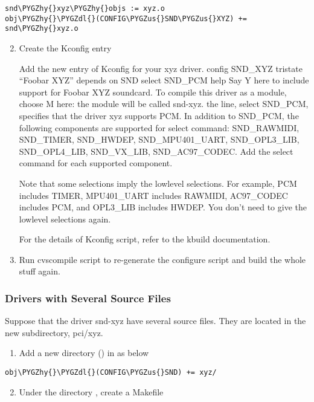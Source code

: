 \documentclass[a4paper,8pt,english]{sphinxmanual}
\def\PYGZus{\char`\_}
\def\PYGZdl{\char`\$}
\def\PYGZhy{\char`\-}
\begin{document}
\begin{Verbatim}[commandchars=\\\{\}]
snd\PYGZhy{}xyz\PYGZhy{}objs := xyz.o
obj\PYGZhy{}\PYGZdl{}(CONFIG\PYGZus{}SND\PYGZus{}XYZ) += snd\PYGZhy{}xyz.o
\end{Verbatim}
\begin{enumerate}
\setcounter{enumi}{1}
\item {} 
Create the Kconfig entry

Add the new entry of Kconfig for your xyz driver. config SND\_XYZ
tristate ``Foobar XYZ'' depends on SND select SND\_PCM help Say Y here
to include support for Foobar XYZ soundcard. To compile this driver
as a module, choose M here: the module will be called snd-xyz. the
line, select SND\_PCM, specifies that the driver xyz supports PCM. In
addition to SND\_PCM, the following components are supported for
select command: SND\_RAWMIDI, SND\_TIMER, SND\_HWDEP,
SND\_MPU401\_UART, SND\_OPL3\_LIB, SND\_OPL4\_LIB, SND\_VX\_LIB,
SND\_AC97\_CODEC. Add the select command for each supported
component.

Note that some selections imply the lowlevel selections. For example,
PCM includes TIMER, MPU401\_UART includes RAWMIDI, AC97\_CODEC
includes PCM, and OPL3\_LIB includes HWDEP. You don't need to give
the lowlevel selections again.

For the details of Kconfig script, refer to the kbuild documentation.

\item {} 
Run cvscompile script to re-generate the configure script and build
the whole stuff again.

\end{enumerate}


\subsubsection{Drivers with Several Source Files}
\label{sound/kernel-api/writing-an-alsa-driver:drivers-with-several-source-files}
Suppose that the driver snd-xyz have several source files. They are
located in the new subdirectory, pci/xyz.
\begin{enumerate}
\item {} 
Add a new directory () in  as
below

\end{enumerate}

\begin{Verbatim}[commandchars=\\\{\}]
obj\PYGZhy{}\PYGZdl{}(CONFIG\PYGZus{}SND) += xyz/
\end{Verbatim}
\begin{enumerate}
\setcounter{enumi}{1}
\item {} 
Under the directory , create a Makefile

\end{enumerate}
\end{document}

